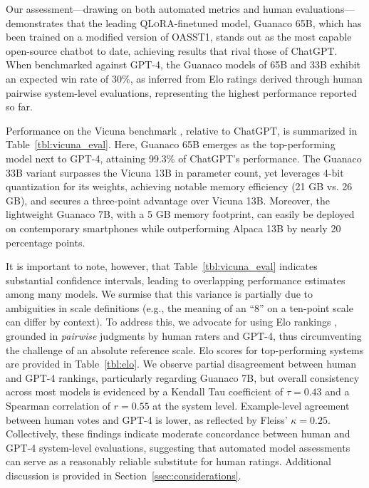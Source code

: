 Our assessment—drawing on both automated metrics and human evaluations—demonstrates that the leading \textsc{QLoRA}-finetuned model, {Guanaco} 65B, which has been trained on a modified version of OASST1, stands out as the most capable open-source chatbot to date, achieving results that rival those of ChatGPT. When benchmarked against GPT-4, the {Guanaco} models of 65B and 33B exhibit an expected win rate of 30\%, as inferred from Elo ratings derived through human pairwise system-level evaluations, representing the highest performance reported so far.

Performance on the Vicuna benchmark \cite{vicuna2023}, relative to ChatGPT, is summarized in Table~\ref{tbl:vicuna_eval}. Here, {Guanaco} 65B emerges as the top-performing model next to GPT-4, attaining 99.3\% of ChatGPT's performance. The {Guanaco} 33B variant surpasses the Vicuna 13B in parameter count, yet leverages 4-bit quantization for its weights, achieving notable memory efficiency (21 GB vs. 26 GB), and secures a three-point advantage over Vicuna 13B. Moreover, the lightweight {Guanaco} 7B, with a 5 GB memory footprint, can easily be deployed on contemporary smartphones while outperforming Alpaca 13B by nearly 20 percentage points.

It is important to note, however, that Table~\ref{tbl:vicuna_eval} indicates substantial confidence intervals, leading to overlapping performance estimates among many models. We surmise that this variance is partially due to ambiguities in scale definitions (e.g., the meaning of an “8” on a ten-point scale can differ by context). To address this, we advocate for using Elo rankings \citep{elo1967proposed}, grounded in \textit{pairwise} judgments by human raters and GPT-4, thus circumventing the challenge of an absolute reference scale. Elo scores for top-performing systems are provided in Table~\ref{tbl:elo}. We observe partial disagreement between human and GPT-4 rankings, particularly regarding Guanaco 7B, but overall consistency across most models is evidenced by a Kendall Tau coefficient of $\tau=0.43$ and a Spearman correlation of $r=0.55$ at the system level. Example-level agreement between human votes and GPT-4 is lower, as reflected by Fleiss' $\kappa=0.25$. Collectively, these findings indicate moderate concordance between human and GPT-4 system-level evaluations, suggesting that automated model assessments can serve as a reasonably reliable substitute for human ratings. Additional discussion is provided in Section~\ref{ssec:considerations}.

